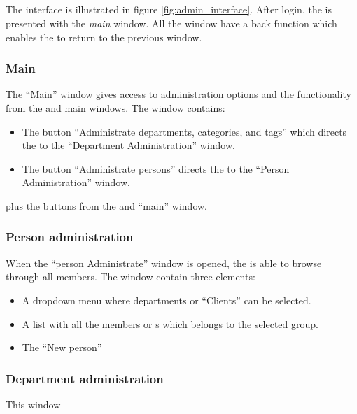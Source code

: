 \subsection{\ainterface}
\label{sec:admininterface}
The \admin[] interface is illustrated in figure \ref{fig:admin_interface}.
After login, the \admin[] is presented with the \textit{main} window. All the window have a back function which enables the \admin[] to return to the previous window.

\subsubsection{Main}
The ``Main'' \admin window gives access to administration options and the functionality from the \astaff and \aclient main windows. The window contains: 
\begin{itemize}
	\item The button ``Administrate departments, categories, and tags'' which directs the \admin[] to the ``Department Administration'' window.  
	\item The button ``Administrate persons'' directs the \admin[] to the ``Person Administration'' window.
\end{itemize}
plus the buttons from the \astaff[] and \aclient[] ``main'' window.

\subsubsection{Person administration}
When the ``person Administrate'' window is opened, the \admin is able to browse through all \astaff members. The window contain three elements:
\begin{itemize}
	\item A dropdown menu where departments or ``Clients'' can be selected.
	\item A list with all the \astaff members or \aclient s which belongs to the selected group.
	\item The ``New person'' 
\end{itemize}

\subsubsection{Department administration}
This window 


